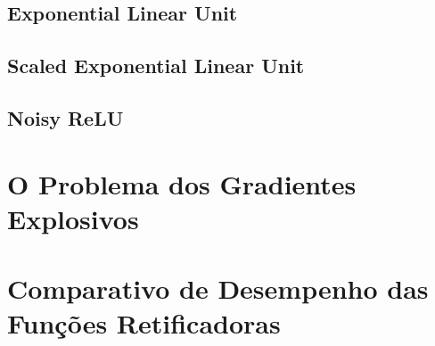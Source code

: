 \subsection{Exponential Linear Unit}

\subsection{Scaled Exponential Linear Unit}

\subsection{Noisy ReLU}

\section{O Problema dos Gradientes Explosivos}

\section{Comparativo de Desempenho das Funções Retificadoras}